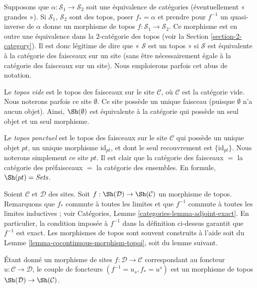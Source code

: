 \noindent
Supposons que $\alpha : \mathcal{S}_1 \to \mathcal{S}_2$ soit une équivalence de
catégories (éventuellement « grandes »). Si $\mathcal{S}_1$, $\mathcal{S}_2$
sont des topos, poser $f_* = \alpha$ et prendre pour $f^{-1}$ un quasi-inverse
de $\alpha$ donne un morphisme de topos $f : \mathcal{S}_1 \to \mathcal{S}_2$.
Ce morphisme est en outre une équivalence dans la $2$-catégorie des topos (voir
la Section \ref{section-2-category}).
Il est donc légitime de dire que « $\mathcal{S}$ est un topos » si $\mathcal{S}$
est équivalente à la catégorie des faisceaux sur un site (sans être nécessairement
égale à la catégorie des faisceaux sur un site). Nous emploierons parfois
cet abus de notation.

\medskip\noindent
Le {\it topos vide} est le topos
des faisceaux sur le site $\mathcal{C}$, où $\mathcal{C}$
est la catégorie vide. Nous noterons parfois ce site $\emptyset$.
Ce site possède un unique faisceau (puisque $\emptyset$ n’a aucun
objet). Ainsi, $\Sh(\emptyset)$ est équivalente à la catégorie
qui possède un seul objet et un seul morphisme.

\medskip\noindent
Le {\it topos ponctuel} est le topos des faisceaux sur le site
$\mathcal{C}$ qui possède un unique objet $pt$, un unique morphisme
$\text{id}_{pt}$, et dont le seul recouvrement est
$\{\text{id}_{pt}\}$. Nous noterons simplement ce site $pt$.
Il est clair que la catégorie des faisceaux $ = $ la catégorie des
préfaisceaux $ = $ la catégorie des ensembles.
En formule, $\Sh(pt) = \textit{Sets}$.

\medskip\noindent
Soient $\mathcal{C}$ et $\mathcal{D}$ des sites. Soit
$f : \Sh(\mathcal{D}) \to \Sh(\mathcal{C})$ un morphisme de topos.
Remarquons que $f_*$ commute à toutes les limites et que
$f^{-1}$ commute à toutes les limites inductives ; voir Catégories,
Lemme \ref{categories-lemma-adjoint-exact}.
En particulier, la condition imposée à $f^{-1}$ dans la définition ci-dessus
garantit que $f^{-1}$ est exact. Les morphismes de topos sont souvent construits
à l’aide soit du Lemme \ref{lemma-cocontinuous-morphism-topoi},
soit du lemme suivant.

\begin{lemma}
\label{lemma-morphism-sites-topoi}
Étant donné un morphisme de sites $f : \mathcal{D} \to \mathcal{C}$
correspondant au foncteur $u : \mathcal{C} \to \mathcal{D}$,
le couple de foncteurs $(f^{-1} = u_s, f_* = u^s)$ est un morphisme de topos
$\Sh(\mathcal{D}) \to \Sh(\mathcal{C})$.
\end{lemma}

